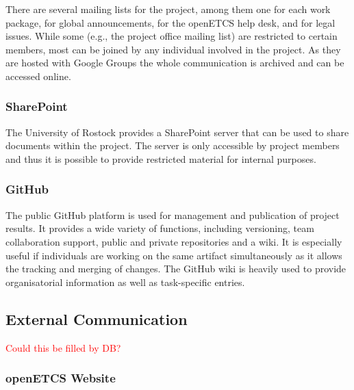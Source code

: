 There are several mailing lists for the project, among them one for each work package, for global announcements, for the openETCS help desk, and for legal issues. While some (e.g., the project office mailing list) are restricted to certain members, most can be joined by any individual involved in the project. As they are hosted with Google Groups the whole communication is archived and can be accessed online.

\subsubsection{SharePoint}

The University of Rostock provides a SharePoint server that can be used to share documents within the project. The server is only accessible by project members and thus it is possible to provide restricted material for internal purposes.

\subsubsection{GitHub}

The public GitHub platform is used for management and publication of project results. It provides a wide variety of functions, including versioning, team collaboration support, public and private repositories and a wiki. It is especially useful if individuals are working on the same artifact simultaneously as it allows the tracking and merging of changes. The GitHub wiki is heavily used to provide organisatorial information as well as task-specific entries.

\subsection{External Communication}
\textcolor{red}{Could this be filled by DB?}

\subsubsection{openETCS Website}


